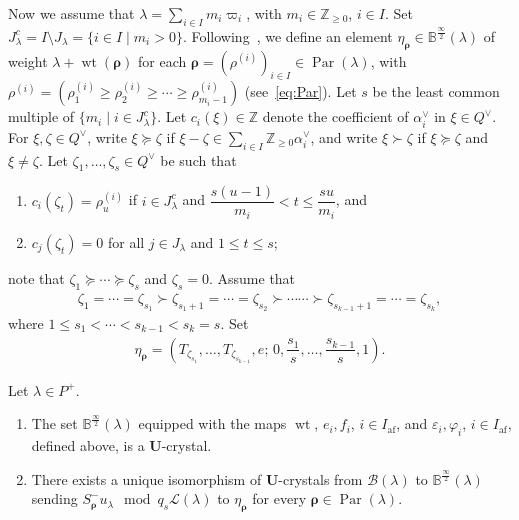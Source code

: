 \documentclass[ALCO,ThmDefs,Unicode,epreuves]{cedram}
\newcommand{\BZ}{\mathbb{Z}}
\newcommand\bmrho[1]{\boldsymbol{#1}}
\renewcommand{\U}{\mathbf{U}}
\newcommand{\si}{\frac{\infty}{2}}
\DeclareMathOperator{\af}{af}
\DeclareMathOperator{\wt}{wt}
\DeclareMathOperator{\Par}{Par}
\begin{document}
Now we assume that 
$\lambda = \sum_{i \in I} m_i \varpi_i$, 
with 
$m_i \in \BZ_{\geq 0}$, 
$i \in I$. 
Set 
$J_{\lambda}^c = I \setminus J_{\lambda} = \{ i \in I \mid m_i > 0 \}$. 
Following~\cite[Equation~(7.2.2)]{INS16}, 
we define an element 
$\eta_{\bmrho{\rho}} \in \mathbb{B}^{\si}(\lambda)$ 
of weight 
$\lambda + \wt (\bmrho{\rho})$
for each 
$\bmrho{\rho} = \left( \rho^{(i)} \right)_{i \in I} \in \Par (\lambda)$, 
with 
$\rho^{(i)} = \left(\rho^{(i)}_1 \geq \rho^{(i)}_2 \geq \cdots \geq \rho^{(i)}_{m_i-1}\right)$
(see~\eqref{eq:Par}). 
Let 
$s$ 
be the least common multiple of 
$\{ m_i \mid i \in J_{\lambda}^c \}$. 
Let 
$c_i (\xi) \in \BZ$ 
denote the coefficient of 
$\alpha_i^{\vee}$ 
in 
$\xi \in Q^{\vee}$.
For 
$\xi , \zeta \in Q^{\vee}$, 
write 
$\xi \succeq \zeta$ 
if 
$\xi - \zeta \in \sum_{i \in I} \BZ_{\geq 0} \alpha_i^{\vee}$, 
and write 
$\xi \succ \zeta$
if 
$\xi \succeq \zeta$ 
and 
$\xi \neq \zeta$. 
Let 
$\zeta_1 , \ldots , \zeta_s \in Q^{\vee}$
be such that 
\begin{enumerate}[label=(\roman*)]
\item
$c_i(\zeta_t) = \rho^{(i)}_u$ 
if $i \in J_{\lambda}^c$ 
and $\dfrac{s(u-1)}{m_i} < t \leq \dfrac{su}{m_i}$, and 
\item
$c_j(\zeta_t) = 0$ 
for all $j \in J_{\lambda}$ and $1 \leq t \leq s$; 
\end{enumerate}
note that 
$\zeta_1 \succeq \cdots \succeq \zeta_s$
and 
$\zeta_s = 0$. 
Assume that
\begin{align}
\zeta_1 = \cdots = \zeta_{s_1} \succ \zeta_{s_1 + 1} = \cdots = \zeta_{s_2} \succ \cdots \cdots 
\succ \zeta_{s_{k-1} + 1} = \cdots = \zeta_{s_k}, 
\end{align}
where 
$1 \leq s_1 < \cdots < s_{k-1} < s_k = s$.
Set 
\begin{align}
\eta_{\bmrho{\rho}} 
=
\left( 
T_{\zeta_{s_1}} , \ldots , T_{\zeta_{s_{k-1}}} , e ; \, 
0 , \dfrac{s_1}{s} , \ldots , \dfrac{s_{k-1}}{s} , 1
\right) .
\end{align}

\begin{theo} \label{thm:SiLS-isom}
Let $\lambda \in P^+$.
\begin{enumerate}[label=(\arabic*)]
\item\label{Theo2.7_1}
The set
$\mathbb{B}^{\si}(\lambda)$
equipped with the maps 
$\wt $, 
$e_i , f_i$, $i \in I_{\af}$, and
$\varepsilon_i , \varphi_i$, $i \in I_{\af}$, 
defined above, is a $\U$-crystal. 
\item\label{Theo2.7_2}
There exists a unique 
isomorphism of $\U$-crystals from 
$\mathcal{B}(\lambda)$
to 
$\mathbb{B}^{\si}(\lambda)$
sending 
$S_{\bmrho{\rho}}^- u_{\lambda} \mod q_s \mathcal{L}(\lambda)$ 
to 
$\eta_{\bmrho{\rho}}$
for every 
$\bmrho{\rho} \in \Par (\lambda)$. 
\end{enumerate}
\end{theo}
\end{document}
